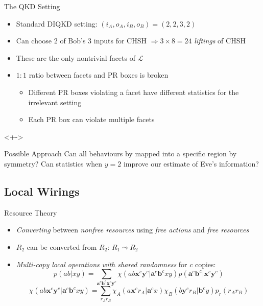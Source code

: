 \documentclass[xcolor=dvipsnames]{beamer}
\newcommand{\?}{\mathrel{?}} %
\newcommand{\cvec}[1]{\boldsymbol{\mathbf{#1}}}    %
\newcommand{\Ls}{\mathcal{L}}
\begin{document}
\begin{frame}{The QKD Setting}
  \begin{itemize}[<+->]
    \item Standard DIQKD setting: \((i_A, o_A, i_B, o_B) = (2,2,3,2)\)
    \item Can choose 2 of Bob's 3 inputs for CHSH \(\Rightarrow 3 \times 8 = 24\) \emph{liftings} of CHSH
    \item These are the only nontrivial facets of \(\Ls\)
    \item \(1 : 1\) ratio between facets and PR boxes is broken
      \begin{itemize}
        \item Different PR boxes violating a facet have different statistics for the irrelevant setting
        \item Each PR box can violate multiple facets
      \end{itemize}
  \end{itemize}
  \begin{onlyenv}<+->
    \begin{block}{Possible Approach}
      Can all behaviours by mapped into a specific region by symmetry? Can statistics when \(y=2\) improve our estimate of Eve's information?
    \end{block}
  \end{onlyenv}
\end{frame}


\subsection{Local Wirings}

\begin{frame}{Resource Theory}
  \begin{itemize}[<+->]
    \item \emph{Converting} between \emph{nonfree resources} using \emph{free actions} and \emph{free resources}
    \item \(R_2\) can be converted from \(R_2\): \(R_1 \leadsto R_2\)
    \item \emph{Multi-copy local operations with shared randomness} for \(c\) copies:
      \[ p(ab|xy) = \sum_{\cvec{a}^c\cvec{b}^c\cvec{x}^c\cvec{y}^c} \chi(ab\cvec{x}^c\cvec{y}^c|\cvec{a}^c\cvec{b}^cxy) p(\cvec{a}^c\cvec{b}^c|\cvec{x}^c\cvec{y}^c) \]
      \[ \chi(ab\cvec{x}^c\cvec{y}^c|\cvec{a}^c\cvec{b}^cxy) = \sum_{r_A r_B} \chi_A(a\cvec{x}^c r_A|\cvec{a}^cx) \chi_B(b\cvec{y}^c r_B|\cvec{b}^cy) p_r(r_A r_B) \]
  \end{itemize}
\end{frame}
\end{document}
